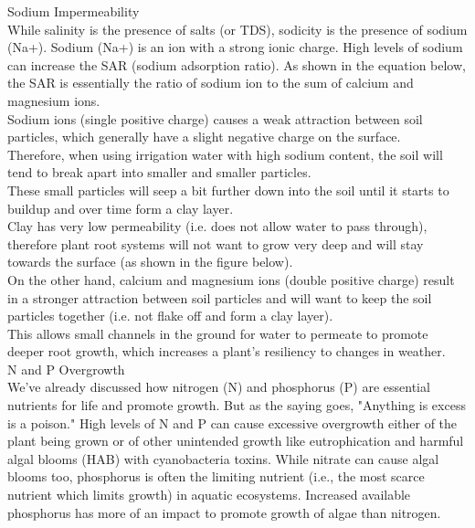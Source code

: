 \documentclass{article}
\begin{document}
Sodium Impermeability\\
While salinity is the presence of salts (or TDS), sodicity is the presence of sodium (Na+).  Sodium (Na+) is an ion with a strong ionic charge.  High levels of sodium can increase the SAR (sodium adsorption ratio).  As shown in the equation below, the SAR is essentially the ratio of sodium ion to the sum of calcium and magnesium ions.\\
 
Sodium ions (single positive charge) causes a weak attraction between soil particles, which generally have a slight negative charge on the surface. \\ Therefore, when using irrigation water with high sodium content, the soil will tend to break apart into smaller and smaller particles. \\ These small particles will seep a bit further down into the soil until it starts to buildup and over time form a clay layer. \\ Clay has very low permeability (i.e. does not allow water to pass through), therefore plant root systems will not want to grow very deep and will stay towards the surface (as shown in the figure below). \\ On the other hand, calcium and magnesium ions (double positive charge) result in a stronger attraction between soil particles and will want to keep the soil particles together (i.e. not flake off and form a clay layer). \\ This allows small channels in the ground for water to permeate to promote deeper root growth, which increases a plant's resiliency to changes in weather.\\
  
 
N and P Overgrowth\\
We've already discussed how nitrogen (N) and phosphorus (P) are essential nutrients for life and promote growth.  But as the saying goes, "Anything is excess is a poison."  High levels of N and P can cause excessive overgrowth either of the plant being grown or of other unintended growth like eutrophication and harmful algal blooms (HAB) with cyanobacteria toxins.   While nitrate can cause algal blooms too, phosphorus is often the limiting nutrient (i.e., the most scarce nutrient which limits growth) in aquatic ecosystems.  Increased available phosphorus has more of an impact to promote growth of algae than nitrogen.\\
   
\end{document}
